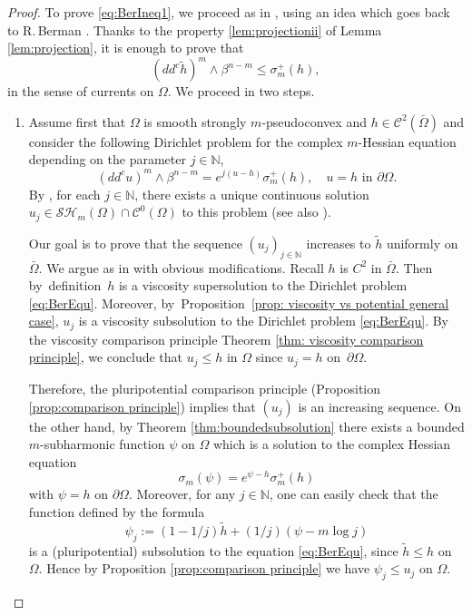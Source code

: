 \documentclass[11pt]{article}
\numberwithin{equation}{section}
\theoremstyle{definition}
\newcommand{\N}{\mathbb{N}}
\newcommand{\Cc}{\mathcal{C}}
\theoremstyle{plain}
\theoremstyle{definition}
\begin{document}
\begin{proof} To prove \eqref{eq:BerIneq1}, we proceed as in \cite{GLZ19}, using an idea which goes back to R.\,Berman \cite{Ber19}. Thanks to the property \eqref{lem:projectionii} of Lemma \ref{lem:projection}, it is enough to prove that
\begin{equation} \label{eq:BerIneq2}
(dd^c \tilde h)^m \wedge \beta^{n - m} \leq \sigma_m^+ (h),
\end{equation}
in the sense of currents on $\Omega$. We proceed in two steps.

\begin{enumerate}
\item
Assume first that $\Omega$ is smooth strongly $m$-pseudoconvex and $h \in \Cc^2 (\bar \Omega)$ and consider the following Dirichlet problem for the complex $m$-Hessian equation depending on the parameter $j \in \N$,
\begin{equation} \label{eq:BerEqu}
(dd^c u)^m \wedge \beta^{n - m} = e^{j (u-h)} \sigma_m^+ (h), \quad u = h\text{ in }\partial \Omega.
\end{equation}
By \cite{Lu13}, for each $j\!\in\!\N$, there exists a unique continuous solution $u_j\!\in\!\mathcal {SH}_m (\Omega) \cap\Cc^0 (\Omega)$ to this problem (see also \cite{Ch16}).

Our goal is to prove that the sequence $(u_j)_{j\in \N}$ increases to $ \tilde h$ uniformly on $\bar{\Omega}$. We argue as in \cite{GLZ19} with obvious modifications. Recall $h$ is $C^2$ in $\bar{\Omega}$. Then by~definition~$h$ is a viscosity supersolution to the Dirichlet problem \eqref{eq:BerEqu}. Moreover, by~Proposition~\ref{prop: viscosity vs potential general case}, $u_j$ is a viscosity subsolution to the Dirichlet problem \eqref{eq:BerEqu}. By the viscosity comparison principle Theorem \ref{thm: viscosity comparison principle}, we conclude that $u_j \leq h$ in $ \Omega$ since $u_j = h$ on~$\partial \Omega$.

Therefore, the pluripotential comparison principle (Proposition \ref{prop:comparison principle}) implies that $(u_j)$ is an increasing sequence.
On the other hand, by Theorem \ref{thm:boundedsubsolution} there exists a bounded $m$-subharmonic function $\psi$ on $\Omega$ which is a solution to the complex Hessian equation
\[
\sigma_m (\psi) = e^{\psi - h} \sigma_m^+ (h)
\]
with $\psi = h$ on $\partial \Omega$.
Moreover, for any $j \in \N$, one can easily check that the function defined by the formula
\[
\psi_j:= (1- 1 \slash j) \tilde h + (1 \slash j) ( \psi - m \log j)
\]
is a (pluripotential) subsolution to the equation \eqref{eq:BerEqu}, since $ \tilde h \leq h$ on $\Omega$. Hence by Proposition \ref{prop:comparison principle} we have $\psi_j \leq u_j$ on $\Omega$.


\end{enumerate}
\end{proof}
\end{document}
